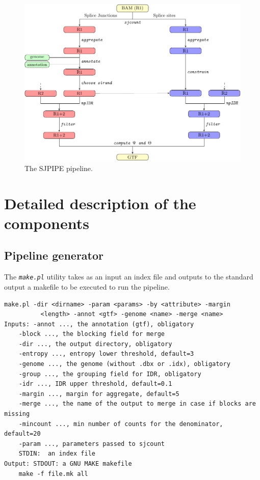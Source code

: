 \documentclass{article}
\newcommand{\prog}[1]{{\tt\em #1}}
\begin{document}
\begin{figure}
\centering
\includegraphics[width=\textwidth]{latex/fig1_crop.pdf}
\caption{The SJPIPE pipeline.\label{fig::sjpipe}}
\end{figure}


\section{Detailed description of the components}

\subsection{Pipeline generator}
The \prog{make.pl} utility takes as an input an index file and outputs to the standard output a makefile to be executed to run the pipeline.
\begin{verbatim} 
make.pl -dir <dirname> -param <params> -by <attribute> -margin 
          <length> -annot <gtf> -genome <name> -merge <name>
Inputs:	-annot ..., the annotation (gtf), obligatory
	-block ..., the blocking field for merge
	-dir ..., the output directory, obligatory
	-entropy ..., entropy lower threshold, default=3
	-genome ..., the genome (without .dbx or .idx), obligatory
	-group ..., the grouping field for IDR, obligatory
	-idr ..., IDR upper threshold, default=0.1
	-margin ..., margin for aggregate, default=5
	-merge ..., the name of the output to merge in case if blocks are missing
	-mincount ..., min number of counts for the denominator, default=20
	-param ..., parameters passed to sjcount
	STDIN:  an index file 
Output: STDOUT: a GNU MAKE makefile
	make -f file.mk all
\end{verbatim} 
\end{document}
